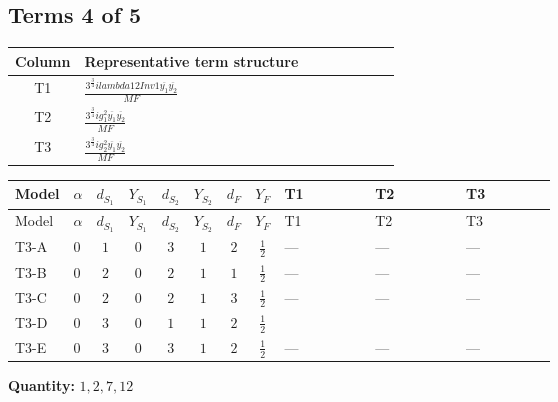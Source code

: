 \documentclass[8pt]{article}
\begin{document}
\begin{landscape}
\subsection*{Terms 4 of 5}
\begin{center}
\begin{tabular}{@{}c >{\raggedright\arraybackslash}p{0.82\linewidth}@{}}
\toprule
Column & Representative term structure \\
\midrule
T1 & \(\displaystyle \frac{3^{\frac{3}{4}} i lambda12Inv1 \overline{y_{1}} \overline{y_{2}}}{MF}\) \\
\midrule
T2 & \(\displaystyle \frac{3^{\frac{3}{4}} i g_{1}^{2} \overline{y_{1}} \overline{y_{2}}}{MF}\) \\
\midrule
T3 & \(\displaystyle \frac{3^{\frac{3}{4}} i g_{2}^{2} \overline{y_{1}} \overline{y_{2}}}{MF}\) \\
\midrule
\bottomrule
\end{tabular}
\end{center}
\smallskip
\tiny
\begin{longtable}{@{}llcccccc >{\raggedright\arraybackslash}p{0.21\linewidth} >{\raggedright\arraybackslash}p{0.21\linewidth} >{\raggedright\arraybackslash}p{0.21\linewidth}@{}}
\toprule
Model & $\alpha$ & $d_{S_1}$ & $Y_{S_1}$ & $d_{S_2}$ & $Y_{S_2}$ & $d_F$ & $Y_F$ & T1 & T2 & T3 \\
\midrule
\endfirsthead
\toprule
Model & $\alpha$ & $d_{S_1}$ & $Y_{S_1}$ & $d_{S_2}$ & $Y_{S_2}$ & $d_F$ & $Y_F$ & T1 & T2 & T3 \\
\midrule
\endhead
T3-A & $0$ & $1$ & $0$ & $3$ & $1$ & $2$ & $\frac{1}{2}$ & --- & --- & --- \\
\midrule
T3-B & $0$ & $2$ & $0$ & $2$ & $1$ & $1$ & $\frac{1}{2}$ & --- & --- & --- \\
\midrule
T3-C & $0$ & $2$ & $0$ & $2$ & $1$ & $3$ & $\frac{1}{2}$ & --- & --- & --- \\
\midrule
T3-D & $0$ & $3$ & $0$ & $1$ & $1$ & $2$ & $\frac{1}{2}$ & \scriptsize\adjustbox{max width=\linewidth}{$\begin{gathered} \frac{3^{\frac{3}{4}} i lambda12Inv1 \overline{y_{1}} \overline{y_{2}}}{6 MF}\end{gathered}$} & \scriptsize\adjustbox{max width=\linewidth}{$\begin{gathered} \frac{3^{\frac{3}{4}} i g_{1}^{2} \overline{y_{1}} \overline{y_{2}}}{8 MF}\end{gathered}$} & \scriptsize\adjustbox{max width=\linewidth}{$\begin{gathered} \frac{25 \cdot 3^{\frac{3}{4}} i g_{2}^{2} \overline{y_{1}} \overline{y_{2}}}{24 MF}\end{gathered}$} \\
\midrule
T3-E & $0$ & $3$ & $0$ & $3$ & $1$ & $2$ & $\frac{1}{2}$ & --- & --- & --- \\
\midrule
\bottomrule
\end{longtable}
\clearpage
\noindent\textbf{Quantity: }$\mathrm{1,2,7,12}$\par\smallskip

\end{landscape}
\end{document}
